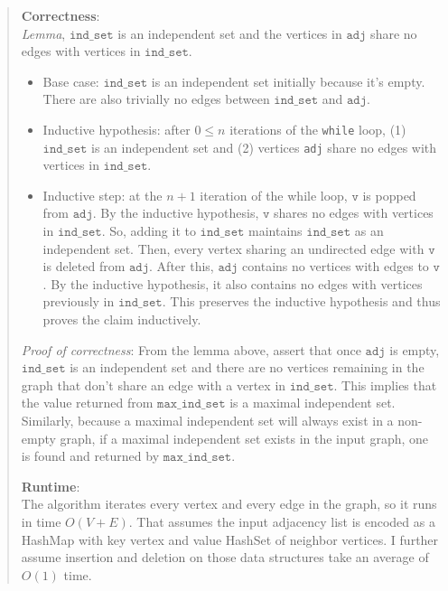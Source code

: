 \documentclass[11pt]{article}
\begin{document}
\begin{enumerate}
\begin{enumerate}
\begin{quote}
      \textbf{Correctness}: \\ 
      \textit{Lemma}, $\texttt{ind\_set}$ is an independent set and the vertices in $\texttt{adj}$ share no edges with vertices in $\texttt{ind\_set}$. 
      \begin{itemize}
        \item Base case: $\texttt{ind\_set}$ is an independent set initially because it's empty. There are also trivially no edges between $\texttt{ind\_set}$ and $\texttt{adj}$.
        \item Inductive hypothesis: after $0 \leq n$ iterations of the \texttt{while} loop, (1) $\texttt{ind\_set}$ is an independent set and (2) vertices \texttt{adj} share no edges with vertices in $\texttt{ind\_set}$. 
        \item Inductive step: at the $n + 1$ iteration of the while loop, $\texttt{v}$ is popped from $\texttt{adj}$. By the inductive hypothesis, $\texttt{v}$ shares no edges with vertices in $\texttt{ind\_set}$. So, adding it to $\texttt{ind\_set}$ maintains $\texttt{ind\_set}$ as an independent set. Then, every vertex sharing an undirected edge with $\texttt{v}$ is deleted from $\texttt{adj}$. After this, $\texttt{adj}$ contains no vertices with edges to $\texttt{v}$. By the inductive hypothesis, it also contains no edges with vertices previously in $\texttt{ind\_set}$. This preserves the inductive hypothesis and thus proves the claim inductively.
      \end{itemize}

      \medskip
      \textit{Proof of correctness}: From the lemma above, assert that once $\texttt{adj}$ is empty, $\texttt{ind\_set}$ is an independent set and there are no vertices remaining in the graph that don't share an edge with a vertex in $\texttt{ind\_set}$. This implies that the value returned from $\texttt{max\_ind\_set}$ is a maximal independent set. Similarly, because a maximal independent set will always exist in a non-empty graph, if a maximal independent set exists in the input graph, one is found and returned by $\texttt{max\_ind\_set}$. 

    \medskip
    \textbf{Runtime}: \\ 
    The algorithm iterates every vertex and every edge in the graph, so it runs in time $O(V + E)$. That assumes the input adjacency list is encoded as a HashMap with key vertex and value HashSet of neighbor vertices. I further assume insertion and deletion on those data structures take an average of $O(1)$ time.
    \end{quote}
\end{enumerate}


\end{enumerate}
\end{document}

